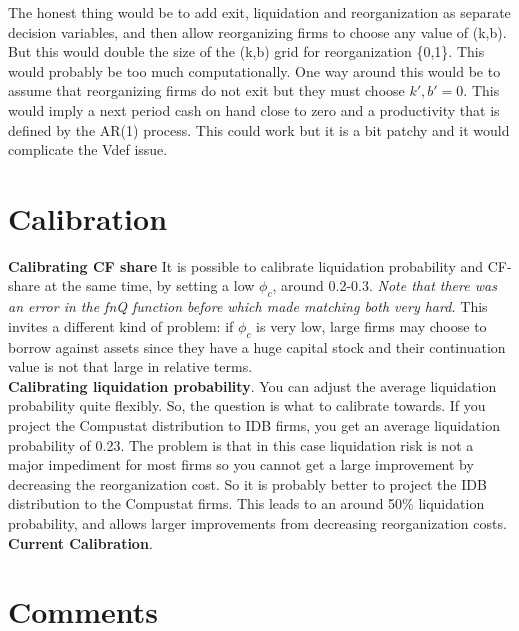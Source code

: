 \documentclass[12pt]{article}
\begin{document}
The honest thing would be to add exit, liquidation and reorganization as separate decision variables, and then allow reorganizing firms to choose any value of (k,b). But this would double the size of the (k,b) grid for reorganization \{0,1\}. This would probably be too much computationally. One way around this would be to assume that reorganizing firms do not exit but they must choose $k',b' = 0$. This would imply a next period cash on hand close to zero and a productivity that is defined by the AR(1) process. This could work but it is a bit patchy and it would complicate the Vdef issue. \vspace{3mm} \\ 
\newpage


\section*{Calibration} 
\textbf{Calibrating CF share} It is possible to calibrate liquidation probability and CF-share at the same time, by setting a low $\phi_c$, around 0.2-0.3. \textit{Note that there was an error in the fnQ function before which made matching both very hard.} This invites a different kind of problem: if $\phi_c$ is very low, large firms may choose to borrow against assets since they have a huge capital stock and their continuation value is not that large in relative terms. \\
\textbf{Calibrating liquidation probability}. You can adjust the average liquidation probability quite flexibly. So, the question is what to calibrate towards. If you project the Compustat distribution to IDB firms, you get an average liquidation probability of 0.23. The problem is that in this case liquidation risk is not a major impediment for most firms so you cannot get a large improvement by decreasing the reorganization cost. So it is probably better to project the IDB distribution to the Compustat firms. This leads to an around 50\% liquidation probability, and allows larger improvements from decreasing reorganization costs. 
\textbf{Current Calibration}.


\section*{Comments}
\end{document}
